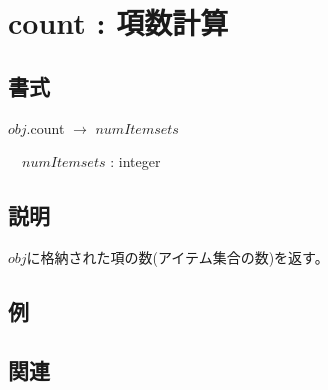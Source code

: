 
\section{count : 項数計算\label{sect:count}}
\subsection*{書式}
$obj$.count $\rightarrow$ $numItemsets$

~~$numItemsets$ : integer

\subsection*{説明}
$obj$に格納された項の数(アイテム集合の数)を返す。

\subsection*{例}


\subsection*{関連}

